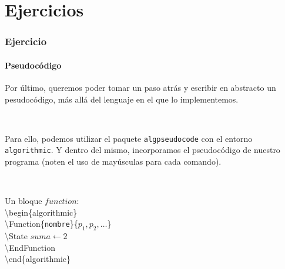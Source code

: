 \section{Ejercicios}\label{ejercicios}

\begin{frame}
\frametitle{Ejercicio}
\framesubtitle{Pseudocódigo}

Por último, queremos poder tomar un paso atrás y escribir en abstracto un pesudocódigo, más allá del lenguaje en el que lo implementemos.

\

Para ello, podemos utilizar el \textcolor{codeorange}{paquete} \texttt{algpseudocode} con el \textcolor{codeorange}{entorno} \texttt{algorithmic}. Y dentro del mismo, incorporamos el pseudocódigo de nuestro programa (noten el uso de mayúsculas para cada comando).

\pause

\


\colorbox{color2}{Un bloque $function$:} \\

\textbackslash begin\{algorithmic\} \\
\textbackslash Function\{\texttt{nombre}\}\{$p_1, p_2,\ldots$\} \\
\hspace*{15pt} \textbackslash State $suma \gets 2$ \\
\textbackslash EndFunction \\
\textbackslash end\{algorithmic\}

\end{frame}

